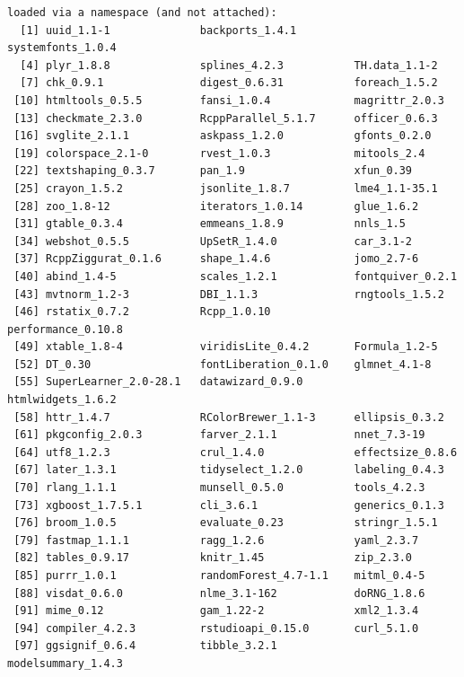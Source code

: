 \documentclass[
  letterpaper,
  DIV=11,
  numbers=noendperiod]{scrreprt}
\begin{document}
\begin{verbatim}
loaded via a namespace (and not attached):
  [1] uuid_1.1-1              backports_1.4.1         systemfonts_1.0.4      
  [4] plyr_1.8.8              splines_4.2.3           TH.data_1.1-2          
  [7] chk_0.9.1               digest_0.6.31           foreach_1.5.2          
 [10] htmltools_0.5.5         fansi_1.0.4             magrittr_2.0.3         
 [13] checkmate_2.3.0         RcppParallel_5.1.7      officer_0.6.3          
 [16] svglite_2.1.1           askpass_1.2.0           gfonts_0.2.0           
 [19] colorspace_2.1-0        rvest_1.0.3             mitools_2.4            
 [22] textshaping_0.3.7       pan_1.9                 xfun_0.39              
 [25] crayon_1.5.2            jsonlite_1.8.7          lme4_1.1-35.1          
 [28] zoo_1.8-12              iterators_1.0.14        glue_1.6.2             
 [31] gtable_0.3.4            emmeans_1.8.9           nnls_1.5               
 [34] webshot_0.5.5           UpSetR_1.4.0            car_3.1-2              
 [37] RcppZiggurat_0.1.6      shape_1.4.6             jomo_2.7-6             
 [40] abind_1.4-5             scales_1.2.1            fontquiver_0.2.1       
 [43] mvtnorm_1.2-3           DBI_1.1.3               rngtools_1.5.2         
 [46] rstatix_0.7.2           Rcpp_1.0.10             performance_0.10.8     
 [49] xtable_1.8-4            viridisLite_0.4.2       Formula_1.2-5          
 [52] DT_0.30                 fontLiberation_0.1.0    glmnet_4.1-8           
 [55] SuperLearner_2.0-28.1   datawizard_0.9.0        htmlwidgets_1.6.2      
 [58] httr_1.4.7              RColorBrewer_1.1-3      ellipsis_0.3.2         
 [61] pkgconfig_2.0.3         farver_2.1.1            nnet_7.3-19            
 [64] utf8_1.2.3              crul_1.4.0              effectsize_0.8.6       
 [67] later_1.3.1             tidyselect_1.2.0        labeling_0.4.3         
 [70] rlang_1.1.1             munsell_0.5.0           tools_4.2.3            
 [73] xgboost_1.7.5.1         cli_3.6.1               generics_0.1.3         
 [76] broom_1.0.5             evaluate_0.23           stringr_1.5.1          
 [79] fastmap_1.1.1           ragg_1.2.6              yaml_2.3.7             
 [82] tables_0.9.17           knitr_1.45              zip_2.3.0              
 [85] purrr_1.0.1             randomForest_4.7-1.1    mitml_0.4-5            
 [88] visdat_0.6.0            nlme_3.1-162            doRNG_1.8.6            
 [91] mime_0.12               gam_1.22-2              xml2_1.3.4             
 [94] compiler_4.2.3          rstudioapi_0.15.0       curl_5.1.0             
 [97] ggsignif_0.6.4          tibble_3.2.1            modelsummary_1.4.3     

\end{verbatim}
\end{document}
